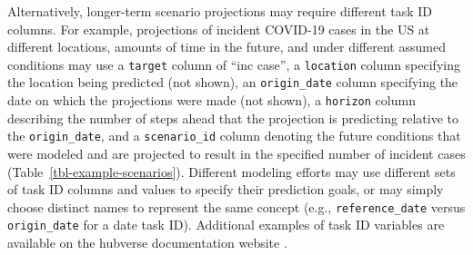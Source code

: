 \documentclass[
  article,
  shortnames,
  notitle]{jss}
\begin{document}
\begin{longtable}[]
\caption{\label{tbl-example-forecasts}Example of forecasts for incident
influenza hospitalizations, formatted according to hubverse standards.
Quantile predictions for the median and 50\% prediction intervals from a
single model are shown for four distinct horizons. The \texttt{location}
and \texttt{reference\_date} columns have been omitted for brevity; all
forecasts in this example were made on 2022-12-17 for Massachusetts.
These predictions are a modified subset of the
\texttt{forecast\_outputs} data provided by the 
package.}

\tabularnewline
\end{longtable}

Alternatively, longer-term scenario projections may require different
task ID columns. For example, projections of incident COVID-19 cases in
the US at different locations, amounts of time in the future, and under
different assumed conditions may use a \texttt{target} column of ``inc
case'', a \texttt{location} column specifying the location being
predicted (not shown), an \texttt{origin\_date} column specifying the
date on which the projections were made (not shown), a \texttt{horizon}
column describing the number of steps ahead that the projection is
predicting relative to the \texttt{origin\_date}, and a
\texttt{scenario\_id} column denoting the future conditions that were
modeled and are projected to result in the specified number of incident
cases (Table~\ref{tbl-example-scenarios}). Different modeling efforts
may use different sets of task ID columns and values to specify their
prediction goals, or may simply choose distinct names to represent the
same concept (e.g., \texttt{reference\_date} versus
\texttt{origin\_date} for a date task ID). Additional examples of task
ID variables are available on the hubverse documentation website
\citep{hubverse_docs}.

\newpage
\end{document}
